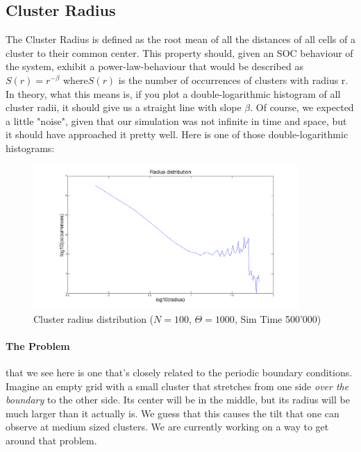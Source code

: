 \documentclass[11pt]{article}
\begin{document}
\subsection{Cluster Radius}
The Cluster Radius is defined as the root mean of all the distances of all cells of a cluster to their common center. This property should, given an SOC behaviour of the system, exhibit a power-law-behaviour that would be described as $S(r)=r^{-\beta}$ where$S(r)$ is the number of occurrences of clusters with radius r. In theory, what this means is, if you plot a double-logarithmic histogram of all cluster radii, it should give us a straight line with slope $\beta$. Of course, we expected a little "noise", given that our simulation was not infinite in time and space, but it should have approached it pretty well. Here is one of those double-logarithmic histograms:
\begin{figure}[H]
\includegraphics[width=0.9\textwidth,keepaspectratio=true]{Pictures/Radius_dist_1.png}
\caption{Cluster radius distribution ($N=100$, $\Theta=1000$, Sim Time 500'000)}
\end{figure}
\paragraph*{The Problem} that we see here is one that's closely related to the periodic boundary conditions. Imagine an empty grid with a small cluster that stretches from one side \emph{over the boundary} to the other side. Its center will be in the middle, but its radius will be much larger than it actually is. We guess that this causes the tilt that one can observe at medium sized clusters. We are currently working on a way to get around that problem. 
\end{document}

